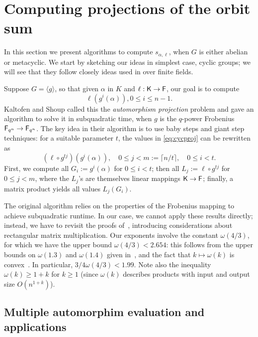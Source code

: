 \section{Computing projections of the orbit sum}\label{sec:osum}

In this section we present algorithms to compute $s_{\alpha,\ell}$,
when $G$ is either abelian or metacyclic. We start by sketching our
ideas in simplest case, cyclic groups; we will see that they follow
closely ideas used in \cite{Kaltofen} over finite fields.

Suppose $G = \langle g \rangle$, so that given $\alpha$ in $K$ and
$\ell: {\mathsf{K}} \to {\mathsf{F}}$, our goal is to compute
\begin{equation}\label{eq:cycproj}
  \ell(g^i(\alpha)), 0 \leq i \leq n-1.
\end{equation}
Kaltofen and Shoup called this the {\em automorphism projection}
problem and gave an algorithm to solve it in subquadratic time, when
$g$ is the $q$-power Frobenius ${\mathsf{F}}_{q^n} \to {\mathsf{F}}_{q^n}$. 
The key idea in their algorithm is to use baby steps and giant step
techniques: for a suitable parameter $t$, the values in \eqref{eq:cycproj} can be rewritten as
$$(\ell \circ g^{tj})(g^i(\alpha)), \quad 0 \leq j < m:=\lceil n/t
\rceil,\quad 0 \leq i <t.$$ First, we compute all $G_i:=g^i(\alpha)$
for $0 \leq i <t$; then all $L_j:=\ell \circ g^{tj}$ for $0 \leq j
<m$, where the $L_j$'s are themselves linear mappings ${\mathsf{K}} \to {\mathsf{F}}$;
finally, a matrix product yields all values $L_j(G_i)$.
 
The original algorithm relies on the properties of the Frobenius
mapping to achieve subquadratic runtime. In our case, we cannot apply
these results directly; instead, we have to revisit the proofs
of~\cite[Lemmata 3, 4 $\&$~ 8]{Kaltofen}, introducing considerations
about rectangular matrix multiplication.  Our exponents involve the
constant $\omega(4/3)$, for which we have the upper bound $\omega(4/3)
< 2.654$: this follows from the upper bounds on $\omega(1.3)$ and
$\omega(1.4)$ given in~\cite{LeGall}, and the fact that $k \mapsto
\omega(k)$ is convex~\cite{LoRo83}. In particular, $3/4 \omega(4/3) <
1.99$. Note also the inequality $\omega(k) \ge 1+k$ for $k\ge 1$
(since $\omega(k)$ describes products with input and output size
$O(n^{1+k})$).


\subsection{Multiple automorphim evaluation and applications}

